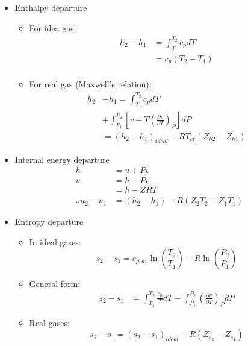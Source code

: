 \begin{itemize}
    \item Enthalpy departure
    \begin{itemize}
        \item For idea gas:
        \begin{align*}
            h_2 - h_1 &= \int_{T_1}^{T_2} c_p dT \\
            &= c_p (T_2 - T_1) \\
        \end{align*}
        \item For real gas (Maxwell's relation):
        \begin{align*}
            h_2 &- h_1 = \int_{T_1}^{T_2} c_p dT \\
            &+ \int_{P_1}^{P_2} \left[v - T \left(\frac{\partial v}{\partial T}\right)_P \right] dP \\
            &= (h_2 - h_1)_{ideal} - R T_{cr} (Z_{h2} - Z_{h1})
        \end{align*}
    \end{itemize}
    \item Internal energy departure
    \begin{align*}
        h &= u + Pv \\
        u &= h - Pv \\
        &= h - ZRT \\
        \therefore u_2 - u_1 &= (h_2 - h_1) - R(Z_2 T_2 - Z_1 T_1)
    \end{align*}
    \item Entropy departure
    \begin{itemize}
        \item In ideal gases:
        \begin{equation*}
            s_2 - s_1 = c_{p,av} \ln \left(\frac{T_2}{T_1}\right) - R \ln \left(\frac{P_2}{P_1}\right)
        \end{equation*}
        \item General form:
        \begin{align*}
            s_2 - s_1 &= \int_{T_1}^{T_2} \frac{c_p}{T} dT - \int_{P_1}^{P_2} \left(\frac{\partial v}{\partial T}\right)_P dP
        \end{align*}
        \item Real gases:
        \begin{equation*}
            s_2 - s_1 = (s_2 -s_1)_{ideal} - R(Z_{s_2} - Z_{s_1})
        \end{equation*}
    \end{itemize}
\end{itemize}